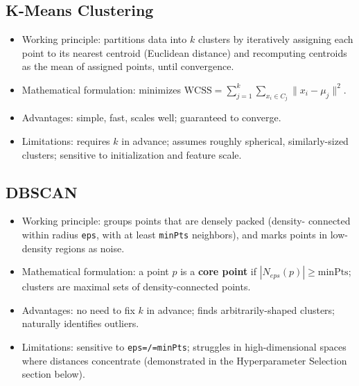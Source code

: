 \documentclass[12pt,a4paper]{article}
\begin{document}
\subsection{K-Means Clustering}
\label{sec:org1b2ba65}
\begin{itemize}
\item Working principle: partitions data into \(k\) clusters by iteratively
assigning each point to its nearest centroid (Euclidean distance) and
recomputing centroids as the mean of assigned points, until convergence.
\item Mathematical formulation: minimizes
\(\text{WCSS} = \sum_{j=1}^{k}\sum_{x_i \in C_j} \lVert x_i - \mu_j \rVert^2\).
\item Advantages: simple, fast, scales well; guaranteed to converge.
\item Limitations: requires \(k\) in advance; assumes roughly spherical,
similarly-sized clusters; sensitive to initialization and feature scale.
\end{itemize}

\subsection{DBSCAN}
\label{sec:orge8df33f}
\begin{itemize}
\item Working principle: groups points that are densely packed (density-
connected within radius \texttt{eps}, with at least \texttt{minPts} neighbors), and
marks points in low-density regions as noise.
\item Mathematical formulation: a point \(p\) is a \textbf{core point} if
\(|N_{eps}(p)| \geq \text{minPts}\); clusters are maximal sets of
density-connected points.
\item Advantages: no need to fix \(k\) in advance; finds arbitrarily-shaped
clusters; naturally identifies outliers.
\item Limitations: sensitive to \texttt{eps=/=minPts}; struggles in high-dimensional
spaces where distances concentrate (demonstrated in the Hyperparameter
Selection section below).
\end{itemize}
\end{document}
